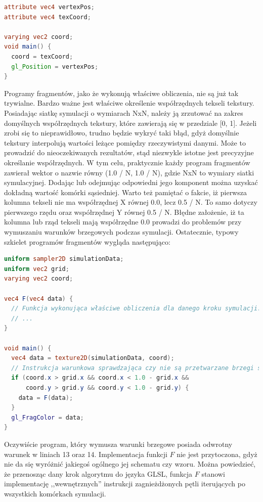 \begin{lstlisting}[language=GLSL, caption=Typowa implementacja programu
wierzchołków w symulatorze \ow{Energy2D} (język GLSL)]
attribute vec4 vertexPos;
attribute vec4 texCoord;

varying vec2 coord;
void main() {
  coord = texCoord;
  gl_Position = vertexPos;
}
\end{lstlisting}

Programy fragmentów, jako że wykonują właściwe obliczenia, nie są już tak
trywialne. Bardzo ważne jest właściwe określenie współrzędnych tekseli
tekstury. Posiadając siatkę symulacji o wymiarach NxN, należy ją zrzutować na
zakres domyślnych współrzędnych tekstury, które zawierają się w przedziale [0,
1]. Jeżeli zrobi się to nieprawidłowo, trudno będzie wykryć taki błąd, gdyż
domyślnie tekstury interpolują wartości leżące pomiędzy rzeczywistymi danymi.
Może to prowadzić do nieoczekiwanych rezultatów, stąd niezwykle istotne jest
precyzyjne określanie współrzędnych. W tym celu, praktycznie każdy program
fragmentów zawierał wektor o nazwie  równy (1.0 / N, 1.0 / N), gdzie
NxN to wymiary siatki symulacyjnej. Dodając lub odejmując odpowiedni jego
komponent można uzyskać dokładną wartość komórki sąsiedniej. Warto też
pamiętać o fakcie, iż pierwsza kolumna tekseli nie ma współrzędnej X równej
0.0, lecz 0.5 / N. To samo dotyczy pierwszego rzędu oraz współrzędnej Y równej
0.5 / N. Błędne założenie, iż ta kolumna lub rząd tekseli mają współrzędne 0.0
prowadzi do problemów przy wymuszaniu warunków brzegowych podczas symulacji.
Ostatecznie, typowy szkielet programów fragmentów wygląda następująco:

\begin{lstlisting}[language=GLSL, caption=Szkielet implementacji programu
fragmentów w symulatorze \ow{Energy2D} (język GLSL)]
uniform sampler2D simulationData;
uniform vec2 grid;
varying vec2 coord;

vec4 F(vec4 data) {
  // Funkcja wykonująca właściwe obliczenia dla danego kroku symulacji.
  // ...
}

void main() {
  vec4 data = texture2D(simulationData, coord);
  // Instrukcja warunkowa sprawdzająca czy nie są przetwarzane brzegi siatki.
  if (coord.x > grid.x && coord.x < 1.0 - grid.x &&
      coord.y > grid.y && coord.y < 1.0 - grid.y) {
    data = F(data);
  }
  gl_FragColor = data;
}
\end{lstlisting}

Oczywiście program, który wymusza warunki brzegowe posiada odwrotny warunek w
liniach 13 oraz 14. Implementacja funkcji $F$ nie jest przytoczona, gdyż nie
da się wyróżnić jakiegoś ogólnego jej schematu czy wzoru. Można powiedzieć, że
przenosząc dany krok algorytmu do języka GLSL, funkcja $F$ stanowi
implementację ,,wewnętrznych'' instrukcji zagnieżdżonych pętli iterujących po
wszystkich komórkach symulacji.


